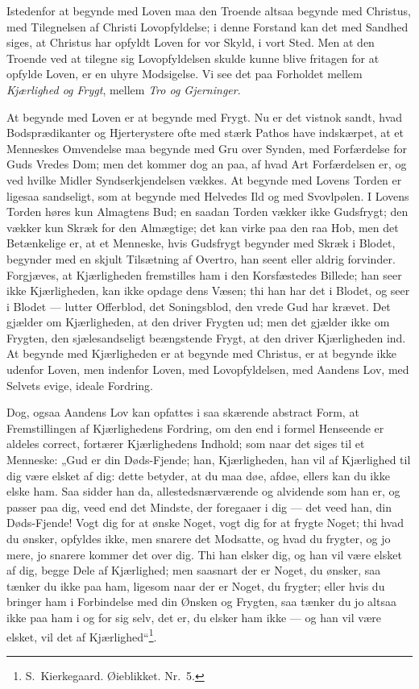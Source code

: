 \documentclass[12pt]{book}
\begin{document}
Istedenfor at begynde med Loven maa den Troende altsaa begynde med
Christus, med Tilegnelsen af Christi Lovopfyldelse; i denne Forstand
kan det med Sandhed siges, at Christus har opfyldt Loven for vor
Skyld, i vort Sted. Men at den Troende ved at tilegne sig
Lovopfyldelsen skulde kunne blive fritagen for at opfylde Loven, er
en uhyre Modsigelse. Vi see det paa Forholdet mellem
\emph{Kjærlighed og Frygt}, mellem \emph{Tro og Gjerninger}.

At begynde med Loven er at begynde med Frygt. Nu er det vistnok
sandt, hvad Bodsprædikanter og Hjerterystere ofte med stærk Pathos
have indskærpet, at et Menneskes Omvendelse maa begynde med Gru over
Synden, med Forfærdelse for Guds Vredes Dom; men det kommer dog an
paa, af hvad Art Forfærdelsen er, og ved hvilke Midler
Syndserkjendelsen vækkes. At begynde med Lovens Torden er ligesaa
sandseligt, som at begynde med Helvedes Ild og med Svovlpølen. I
Lovens Torden høres kun Almagtens Bud; en saadan Torden vækker ikke
Gudsfrygt; den vækker kun Skræk for den Almægtige; det kan virke paa
den raa Hob, men det Betænkelige er, at et Menneske, hvis Gudsfrygt
begynder med Skræk i Blodet, begynder med en skjult Tilsætning af
Overtro, han seent eller aldrig forvinder. Forgjæves, at
Kjærligheden fremstilles ham i den Korsfæstedes Billede; han seer
ikke Kjærligheden, kan ikke opdage dens Væsen; thi han har det i
Blodet, og seer i Blodet --- lutter Offerblod, det Soningsblod, den
vrede Gud har krævet. Det gjælder om Kjærligheden, at den driver
Frygten ud; men det gjælder ikke om Frygten, den sjælesandseligt
beængstende Frygt, at den driver Kjærligheden ind. At begynde med
Kjærligheden er at begynde med Christus, er at begynde ikke udenfor
Loven, men indenfor Loven, med Lovopfyldelsen, med Aandens Lov, med
Selvets evige, ideale Fordring.

Dog, ogsaa Aandens Lov kan opfattes i saa skærende abstract Form, at
Fremstillingen af Kjærlighedens Fordring, om den end i formel
Henseende er aldeles correct, fortærer Kjærlighedens Indhold; som
naar det siges til et Menneske: „Gud er din Døds-Fjende; han,
Kjærligheden, han vil af Kjærlighed til dig være elsket af dig:
dette betyder, at du maa døe, afdøe, ellers kan du ikke elske ham.
Saa sidder han da, allestedsnærværende og alvidende som han er, og
passer paa dig, veed
end det Mindste, der foregaaer i dig --- det veed han, din
Døds-Fjende! Vogt dig for at ønske Noget, vogt dig for at frygte
Noget; thi hvad du ønsker, opfyldes ikke, men snarere det Modsatte,
og hvad du frygter, og jo mere, jo snarere kommer det over dig. Thi
han elsker dig, og han vil være elsket af dig, begge Dele af
Kjærlighed; men saasnart der er Noget, du ønsker, saa tænker du ikke
paa ham, ligesom naar der er Noget, du frygter; eller hvis du
bringer ham i Forbindelse med din Ønsken og Frygten, saa tænker du
jo altsaa ikke paa ham i og for sig selv, det er, du elsker ham ikke
--- og han vil være elsket, vil det af
Kjærlighed“\footnote{S.\ Kierkegaard. Øieblikket. Nr.\ 5.}.
\end{document}
